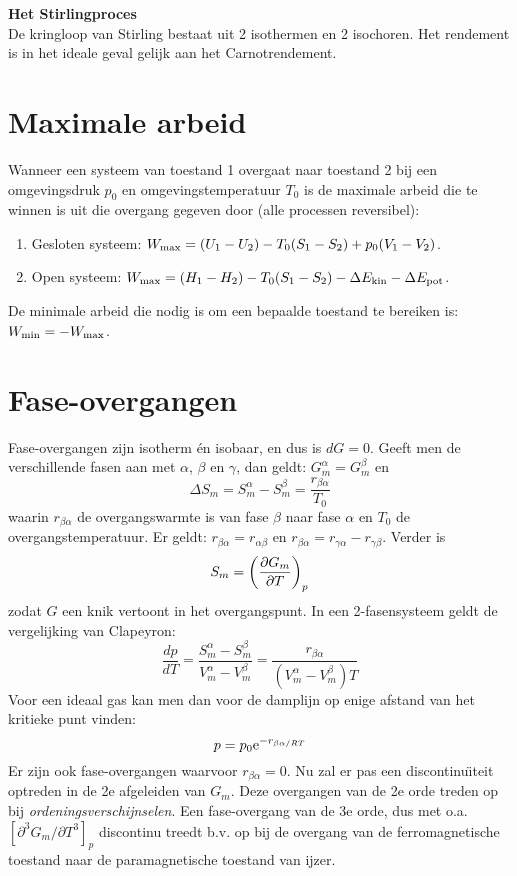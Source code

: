 \documentclass[twoside]{report}
\begin{document}
{\bf Het Stirlingproces}\\[2mm]
De kringloop van Stirling bestaat uit 2 isothermen en 2 isochoren. Het
rendement is in het ideale geval gelijk aan het Carnotrendement.

\section{Maximale arbeid}
Wanneer een systeem van toestand 1 overgaat naar toestand 2 bij een
omgevingsdruk $p_0$ en omgevingstemperatuur $T_0$ is de maximale arbeid die
te winnen is uit die overgang gegeven door (alle processen reversibel):
\begin{enumerate}
\item Gesloten systeem: $W_{\rm max}=(U_1-U_2)-T_0(S_1-S_2)+p_0(V_1-V_2)$.
\item Open systeem: $W_{\rm max}=(H_1-H_2)-T_0(S_1-S_2)-\Delta E_{\rm kin}-\Delta E_{\rm pot}$.
\end{enumerate}
De minimale arbeid die nodig is om een bepaalde toestand te bereiken is:
$W_{\rm min}=-W_{\rm max}$.

\section{Fase-overgangen}
Fase-overgangen zijn isotherm \'en isobaar, en dus is $dG=0$. Geeft men de
verschillende fasen aan met $\alpha$, $\beta$ en $\gamma$, dan geldt:
$G_m^\alpha=G_m^\beta$ en
\[
\Delta S_m=S_m^\alpha - S_m^\beta=\frac{r_{\beta\alpha}}{T_0}
\]
waarin $r_{\beta\alpha}$ de overgangswarmte is van fase $\beta$ naar fase
$\alpha$ en $T_0$ de overgangstemperatuur. Er geldt:
$r_{\beta\alpha}=r_{\alpha\beta}$ en
$r_{\beta\alpha}=r_{\gamma\alpha}-r_{\gamma\beta}$.
Verder is
\[
S_m=\left(\frac{\partial G_m}{\partial T}\right)_{p}
\]
zodat $G$ een knik vertoont in het overgangspunt. In een 2-fasensysteem geldt
de vergelijking van Clapeyron:
\[
\frac{dp}{dT}=\frac{S_m^\alpha-S_m^\beta}{V_m^\alpha-V_m^\beta}=
\frac{r_{\beta\alpha}}{(V_m^\alpha-V_m^\beta)T}
\]
Voor een ideaal gas kan men dan voor de damplijn op enige afstand van het
kritieke punt vinden:
\[
p=p_0{\rm e}^{-r_{\beta\alpha/RT}}
\]
Er zijn ook fase-overgangen waarvoor $r_{\beta\alpha}=0$. Nu zal er pas een
discontinu\"{\i}teit optreden in de 2e afgeleiden van $G_m$. Deze overgangen
van de 2e orde treden op bij {\it ordeningsverschijnselen}.
\npar
Een fase-overgang van de 3e orde, dus met o.a.
$[\partial^3 G_m/\partial T^3]_p$ discontinu treedt b.v. op bij de overgang
van de ferromagnetische toestand naar de paramagnetische toestand van ijzer.
\end{document}
